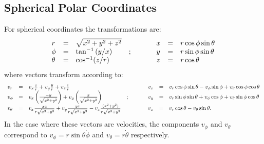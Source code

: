 \documentclass[a4paper,10pt]{article}
\begin{document}
\subsection{ Spherical Polar Coordinates}
For spherical coordinates the transformations are:
\begin{displaymath}
\begin{array}{lclp{1cm}lcl}
r & = & \sqrt{x^2 + y^2 + z^{2}}    & & x & = & r\cos\phi\sin\theta\\
\phi & = & \tan^{-1}{(y/x)}              &; & y & = & r\sin\phi\sin\theta \\
\theta & = & \cos^{-1}(z/r)             & & z & = & r\cos\theta \\
\end{array}
\end{displaymath}
where vectors transform according to:
\begin{displaymath}
\begin{array}{lclp{1cm}lcl}
v_r      & = & v_x \frac{x}{r} + v_y \frac{y}{r} + v_{z}\frac{z}{r}  & & v_x & = & v_r \cos\phi\sin\theta- v_\phi \sin\phi + v_\theta \cos\phi\cos\theta \\
v_\phi & = & v_x \left(\frac{-y}{\sqrt{x^2 + y^{2}}}\right) + v_y \left(\frac{x}{\sqrt{x^2 + y^{2}}}\right) &; &v_y & = & v_r \sin\phi\sin\theta + v_\phi \cos\phi + v_{\theta} \sin\phi\cos\theta \\
v_\theta & = & v_{x}\frac{xz}{r \sqrt{x^{2} + y^{2}}} + v_{y}\frac{yz}{r \sqrt{x^{2} + y^{2}}} - v_{z}\frac{(x^{2} + y^{2})}{r\sqrt{x^{2} + y^{2}}}  & & v_z & = & v_r \cos\theta - v_\theta \sin\theta. \\
\end{array}
\end{displaymath}
In the case where these vectors are velocities, the components $v_{\phi}$ and $v_{\theta}$ correspond to $v_{\phi} = r\sin{\theta}\dot{\phi}$ and $v_{\theta} = r\dot{\theta}$ respectively.
\end{document}
